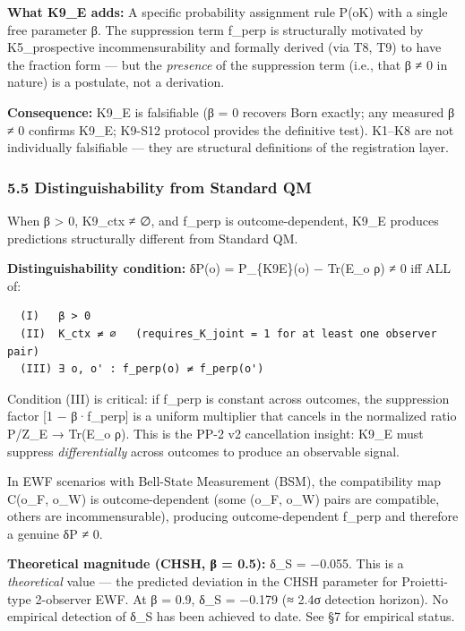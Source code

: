 \documentclass[
  11pt,
]{article}
\begin{document}
\textbf{What K9\_E adds:} A specific probability assignment rule
P(o\textbar K) with a single free parameter β. The suppression term
f\_perp is structurally motivated by K5\_prospective incommensurability
and formally derived (via T8, T9) to have the fraction form --- but the
\emph{presence} of the suppression term (i.e., that β ≠ 0 in nature) is
a postulate, not a derivation.

\textbf{Consequence:} K9\_E is falsifiable (β = 0 recovers Born exactly;
any measured β ≠ 0 confirms K9\_E; K9-S12 protocol provides the
definitive test). K1--K8 are not individually falsifiable --- they are
structural definitions of the registration layer.

\subsubsection{5.5 Distinguishability from Standard
QM}\label{distinguishability-from-standard-qm}

When β \textgreater{} 0, K9\_ctx ≠ ∅, and f\_perp is outcome-dependent,
K9\_E produces predictions structurally different from Standard QM.

\textbf{Distinguishability condition:} δP(o) = P\_\{K9E\}(o) − Tr(E\_o
ρ) ≠ 0 iff ALL of:

\begin{verbatim}
  (I)   β > 0
  (II)  K_ctx ≠ ∅   (requires_K_joint = 1 for at least one observer pair)
  (III) ∃ o, o' : f_perp(o) ≠ f_perp(o')
\end{verbatim}

Condition (III) is critical: if f\_perp is constant across outcomes, the
suppression factor {[}1 − β·f\_perp{]} is a uniform multiplier that
cancels in the normalized ratio P/Z\_E → Tr(E\_o ρ). This is the PP-2 v2
cancellation insight: K9\_E must suppress \emph{differentially} across
outcomes to produce an observable signal.

In EWF scenarios with Bell-State Measurement (BSM), the compatibility
map C(o\_F, o\_W) is outcome-dependent (some (o\_F, o\_W) pairs are
compatible, others are incommensurable), producing outcome-dependent
f\_perp and therefore a genuine δP ≠ 0.

\textbf{Theoretical magnitude (CHSH, β = 0.5):} δ\_S = −0.055. This is a
\emph{theoretical} value --- the predicted deviation in the CHSH
parameter for Proietti-type 2-observer EWF. At β = 0.9, δ\_S = −0.179 (≈
2.4σ detection horizon). No empirical detection of δ\_S has been
achieved to date. See §7 for empirical status.
\end{document}
